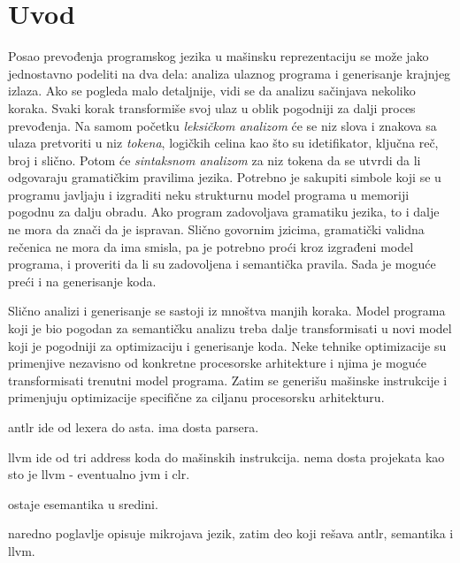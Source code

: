 \chapter{Uvod}

Posao prevođenja programskog jezika u mašinsku reprezentaciju se može jako jednostavno podeliti na dva dela: analiza ulaznog programa i generisanje krajnjeg izlaza\cite{dragon}. Ako se pogleda malo detaljnije, vidi se da analizu sačinjava nekoliko koraka. Svaki korak transformiše svoj ulaz u oblik pogodniji za dalji proces prevođenja. Na samom početku \emph{leksičkom analizom} će se niz slova i znakova sa ulaza pretvoriti u niz \emph{tokena}, logičkih celina kao što su idetifikator, ključna reč, broj i slično. Potom će \emph{sintaksnom analizom} za niz tokena da se utvrdi da li odgovaraju gramatičkim pravilima jezika. Potrebno je sakupiti simbole koji se u programu javljaju i izgraditi neku strukturnu model programa u memoriji pogodnu za dalju obradu. Ako program zadovoljava gramatiku jezika, to i dalje ne mora da znači da je ispravan. Slično govornim jzicima, gramatički validna rečenica ne mora da ima smisla, pa je potrebno proći kroz izgrađeni model programa, i proveriti da li su zadovoljena i semantička pravila. Sada je moguće preći i na generisanje koda.

Slično analizi i generisanje se sastoji iz mnoštva manjih koraka. Model programa koji je bio pogodan za semantičku analizu treba dalje transformisati u novi model koji je pogodniji za optimizaciju i generisanje koda. Neke tehnike optimizacije su primenjive nezavisno od konkretne procesorske arhitekture i njima je moguće transformisati trenutni model programa. Zatim se generišu mašinske instrukcije i primenjuju optimizacije specifične za ciljanu procesorsku arhitekturu.

antlr ide od lexera do asta.
ima dosta parsera.

llvm ide od tri address koda do mašinskih instrukcija.
nema dosta projekata kao sto je llvm - eventualno jvm i clr.

ostaje esemantika u sredini.

naredno poglavlje opisuje mikrojava jezik, zatim deo koji rešava antlr, semantika i llvm.
